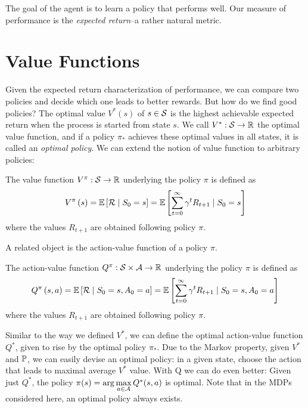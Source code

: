 The goal of the agent is to learn a policy that performs well. Our measure of performance is the \textit{expected return}--a rather natural metric. 

\section{Value Functions}\label{sec3}
Given the expected return characterization of performance, we can compare two policies and decide which one leads to better rewards. But how do we find good policies? The optimal value $V^* (s)$ of $s \in \S$ is the highest achievable expected return when the process is started from state $s$. We call $V^*:\S \rightarrow \mathbb{R}$ the optimal value function, and if a policy $\pi_*$ achieves these optimal values in all states, it is called an \textit{optimal policy}. We can extend the notion of value function to arbitrary policies: 

\begin{definition} The value function $V^{\pi} : \S \rightarrow \mathbb{R}$ underlying the policy $\pi$ is defined as
\begin{align}
  V^{\pi} \left( s \right) = \E \left[ \R \mid S_0 = s \right] = \E \left[\sum\limits_{t=0}^{\infty} \gamma^{t} R_{t+1} \mid S_0 = s \right]
\end{align}
where the values $R_{t+1}$ are obtained following policy $\pi$. 
\end{definition}

A related object is the action-value function of a policy $\pi$. 

\begin{definition} The action-value function $Q^{\pi} : \S \times \A \rightarrow \mathbb{R}$ underlying the policy $\pi$ is defined as
\begin{align}
  Q^{\pi} \left( s, a \right) = \E \left[ \R \mid S_0 = s, A_0 = a \right] = \E \left[\sum\limits_{t=0}^{\infty} \gamma^{t} R_{t+1} \mid S_0 = s, A_0 = a \right]
\end{align}
where the values $R_{t+1}$ are obtained following policy $\pi$. 
\end{definition}

Similar to the way we defined $V^*$, we can define the optimal action-value function $Q^*$, given to rise by the optimal policy $\pi_*$. Due to the Markov property, given $V^*$ and $\P$, we can easily devise an optimal policy: in a given state, choose the action that leads to maximal average $V^*$ value. With Q we can do even better: Given just $Q^*$, the policy $\pi(s) = \arg\max\limits_{a \in \A} Q^*(s, a)$ is optimal. Note that in the MDPs considered here, an optimal policy always exists. 

